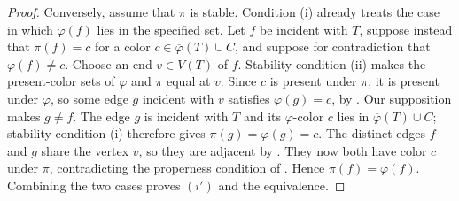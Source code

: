 \begin{proof}
Conversely, assume that $\pi$ is stable.  Condition (i) already treats the
case in which $\varphi(f)$ lies in the specified set.  Let $f$ be incident
with $T$, suppose instead that $\pi(f)=c$ for a color
$c\in\overline\varphi(T)\cup C$, and suppose for contradiction that
$\varphi(f)\ne c$.  Choose an end $v\in V(T)$ of $f$.  Stability condition
(ii) makes the present-color sets of $\varphi$ and $\pi$ equal at $v$.
Since $c$ is present under $\pi$, it is present under $\varphi$, so some
edge $g$ incident with $v$ satisfies $\varphi(g)=c$, by
.  Our supposition makes $g\ne f$.  The edge $g$ is
incident with $T$ and its $\varphi$-color $c$ lies in
$\overline\varphi(T)\cup C$; stability condition (i) therefore gives
$\pi(g)=\varphi(g)=c$.  The distinct edges $f$ and $g$ share the vertex
$v$, so they are adjacent by .  They now both have
color $c$ under $\pi$, contradicting the properness condition of
.  Hence $\pi(f)=\varphi(f)$.  Combining the
two cases proves $(i')$ and the equivalence.
\end{proof}
